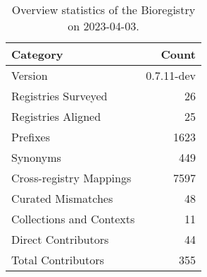 \begin{table}
\centering
\caption{Overview statistics of the Bioregistry on 2023-04-03.}
\label{tab:bioregistry-summary}
\begin{tabular}{lr}
\toprule
                Category &      Count \\
\midrule
                 Version & 0.7.11-dev \\
     Registries Surveyed &         26 \\
      Registries Aligned &         25 \\
                Prefixes &       1623 \\
                Synonyms &        449 \\
 Cross-registry Mappings &       7597 \\
      Curated Mismatches &         48 \\
Collections and Contexts &         11 \\
     Direct Contributors &         44 \\
      Total Contributors &        355 \\
\bottomrule
\end{tabular}
\end{table}
